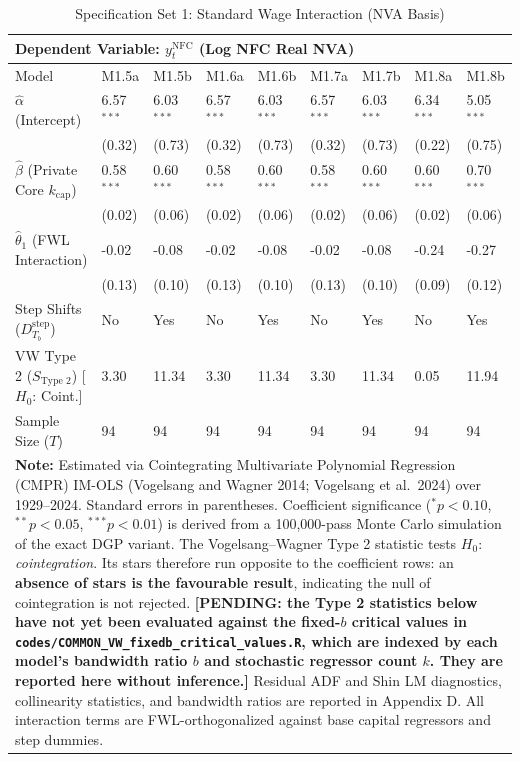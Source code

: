 \begin{table}[H]
\centering
\setlength{\tabcolsep}{2.5pt}
\caption{Specification Set 1: Standard Wage Interaction (NVA Basis)}
\label{tab:specA_set1_nva_core}
\scriptsize
\begin{tabular}{p{3.8cm}p{1.1cm}p{1.1cm}p{1.1cm}p{1.1cm}p{1.1cm}p{1.1cm}p{1.1cm}p{1.1cm}}
\toprule
\multicolumn{9}{l}{\textbf{Dependent Variable: $y_t^{\text{NFC}}$ (Log NFC Real NVA)}} \\
\midrule
Model & M1.5a & M1.5b & M1.6a & M1.6b & M1.7a & M1.7b & M1.8a & M1.8b \\
\midrule
$\hat{\alpha}$ (Intercept) & 6.57$^{***}$ & 6.03$^{***}$ & 6.57$^{***}$ & 6.03$^{***}$ & 6.57$^{***}$ & 6.03$^{***}$ & 6.34$^{***}$ & 5.05$^{***}$ \\
 & (0.32) & (0.73) & (0.32) & (0.73) & (0.32) & (0.73) & (0.22) & (0.75) \\
$\hat{\beta}$ (Private Core $k_{\text{cap}}$) & 0.58$^{***}$ & 0.60$^{***}$ & 0.58$^{***}$ & 0.60$^{***}$ & 0.58$^{***}$ & 0.60$^{***}$ & 0.60$^{***}$ & 0.70$^{***}$ \\
 & (0.02) & (0.06) & (0.02) & (0.06) & (0.02) & (0.06) & (0.02) & (0.06) \\
$\hat{\theta}_1$ (FWL Interaction) & -0.02 & -0.08 & -0.02 & -0.08 & -0.02 & -0.08 & -0.24 & -0.27 \\
 & (0.13) & (0.10) & (0.13) & (0.10) & (0.13) & (0.10) & (0.09) & (0.12) \\
Step Shifts ($D_{T_b}^{\text{step}}$) & No & Yes & No & Yes & No & Yes & No & Yes \\
\midrule
VW Type 2 ($S_{\text{Type 2}}$) [$H_0$: Coint.] & 3.30 & 11.34 & 3.30 & 11.34 & 3.30 & 11.34 & 0.05 & 11.94 \\
\midrule
Sample Size ($T$) & 94 & 94 & 94 & 94 & 94 & 94 & 94 & 94 \\
\bottomrule
\multicolumn{9}{p{14.5cm}}{\footnotesize \textbf{Note:} Estimated via Cointegrating Multivariate Polynomial Regression (CMPR) IM-OLS (Vogelsang and Wagner 2014; Vogelsang et al.\ 2024) over 1929--2024. Standard errors in parentheses. Coefficient significance ($^* p < 0.10$, $^{**} p < 0.05$, $^{***} p < 0.01$) is derived from a 100,000-pass Monte Carlo simulation of the exact DGP variant. The Vogelsang--Wagner Type 2 statistic tests $H_0$: \emph{cointegration}. Its stars therefore run opposite to the coefficient rows: an \textbf{absence of stars is the favourable result}, indicating the null of cointegration is not rejected. \textbf{[PENDING: the Type 2 statistics below have not yet been evaluated against the fixed-$b$ critical values in \texttt{codes/COMMON\_VW\_fixedb\_critical\_values.R}, which are indexed by each model's bandwidth ratio $b$ and stochastic regressor count $k$. They are reported here without inference.]} Residual ADF and Shin LM diagnostics, collinearity statistics, and bandwidth ratios are reported in Appendix D. All interaction terms are FWL-orthogonalized against base capital regressors and step dummies.} \\
\end{tabular}
\end{table}
